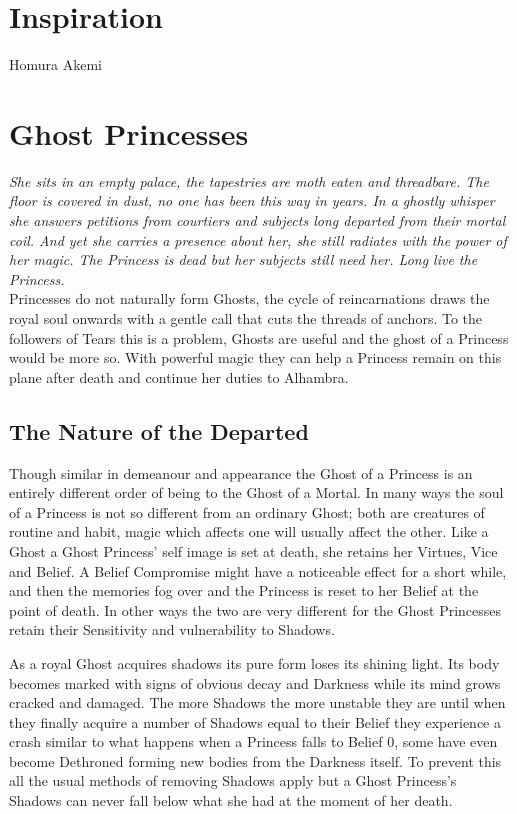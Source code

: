 \section*{Inspiration}

Homura Akemi


\section*{Ghost Princesses}

\textit{She sits in an empty palace, the tapestries are moth eaten and threadbare. The floor is covered in dust, no one has been this way in years. In a ghostly whisper she answers petitions from courtiers and subjects long departed from their mortal coil. And yet she carries a presence about her, she still radiates with the power of her magic. The Princess is dead but her subjects still need her. Long live the Princess. }\\

\noindent Princesses do not naturally form Ghosts, the cycle of reincarnations draws the royal soul onwards with a gentle call that cuts the threads of anchors. To the followers of Tears this is a problem, Ghosts are useful and the ghost of a Princess would be more so. With powerful magic they can help a Princess remain on this plane after death and continue her duties to Alhambra.

\subsection*{The Nature of the Departed}

Though similar in demeanour and appearance the Ghost of a Princess is an entirely different order of being to the Ghost of a Mortal. In many ways the soul of a Princess is not so different from an ordinary Ghost; both are creatures of routine and habit, magic which affects one will usually affect the other. Like a Ghost a Ghost Princess' self image is set at death, she retains her Virtues, Vice and Belief. A Belief Compromise might have a noticeable effect for a short while, and then the memories fog over and the Princess is reset to her Belief at the point of death. In other ways the two are very different for the Ghost Princesses retain their Sensitivity and vulnerability to Shadows.

As a royal Ghost acquires shadows its pure form loses its shining light. Its body becomes marked with signs of obvious decay and Darkness while its mind grows cracked and damaged. The more Shadows the more unstable they are until when they finally acquire a number of Shadows equal to their Belief they experience a crash similar to what happens when a Princess falls to Belief 0, some have even become Dethroned forming new bodies from the Darkness itself. To prevent this all the usual methods of removing Shadows apply but a Ghost Princess's Shadows can never fall below what she had at the moment of her death. 

